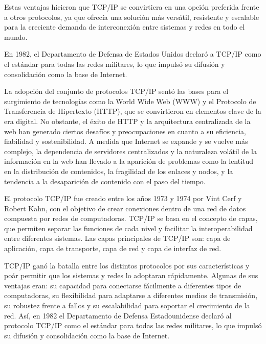 Estas ventajas hicieron que TCP/IP se convirtiera en una opción preferida frente a otros protocolos, ya que ofrecía una solución más versátil, resistente y escalable para la creciente demanda de interconexión entre sistemas y redes en todo el mundo.



En 1982, el Departamento de Defensa de Estados Unidos
declaró a TCP/IP como el estándar para todas las redes militares, lo que impulsó su difusión y consolidación como la base de Internet.

La adopción del conjunto de protocolos TCP/IP sentó las bases para el surgimiento de tecnologías como la World Wide Web (WWW) y el Protocolo de Transferencia de Hipertexto (HTTP), que se convirtieron en elementos clave de la era digital. No obstante, el éxito de HTTP y la arquitectura centralizada de la web han generado ciertos desafíos y preocupaciones en cuanto a su eficiencia, fiabilidad y sostenibilidad. A medida que Internet se expande y se vuelve más complejo, la dependencia de servidores centralizados y la naturaleza volátil de la información en la web han llevado a la aparición de problemas como la lentitud en la distribución de contenidos, la fragilidad de los enlaces y nodos, y la tendencia a la desaparición de contenido con el paso del tiempo.

El protocolo TCP/IP fue creado entre los años 1973 y 1974 por Vint Cerf y Robert Kahn, con el objetivo de crear conexiones
dentro de una red de datos compuesta por redes de computadoras. TCP/IP se basa en el concepto de capas, que permiten separar
las funciones de cada nivel y facilitar la interoperabilidad entre diferentes sistemas. Las capas principales de TCP/IP son:
capa de aplicación, capa de transporte, capa de red y capa de interfaz de red.

TCP/IP ganó la batalla entre los distintos protocolos por sus características y poår permitir que los sistemas y redes lo adoptaran rápidamente. Algunas de sus ventajas eran: su capacidad para conectarse fácilmente a diferentes tipos de computadoras, su flexibilidad para adaptarse a diferentes medios de transmisión, su robustez frente a fallos y su escalabilidad para soportar el crecimiento de la red. Así, en 1982 el Departamento de Defensa Estadounidense declaró al protocolo TCP/IP como el estándar para todas las redes militares, lo que impulsó su difusión y consolidación como la base de Internet.

